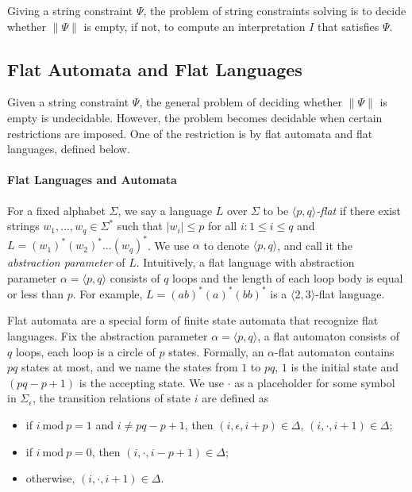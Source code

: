 \documentclass[runningheads]{llncs}
\begin{document}
Giving a string constraint $\Psi$,
the problem of string constraints solving is to decide 
whether $\lVert \Psi \rVert$ is empty,
if not, to compute an interpretation $I$ that satisfies $\Psi$.


\subsection{Flat Automata and Flat Languages}

Given a string constraint $\Psi$,
the general problem of deciding whether $\lVert \Psi \rVert$ is empty is undecidable.
However, 
the problem becomes decidable when certain restrictions are imposed.
One of the restriction is by flat automata and flat languages, 
defined below. 

\paragraph{Flat Languages and Automata}
For a fixed alphabet $\Sigma$,
we say a language $L$ over $\Sigma$ to be \emph{$\langle p,q \rangle$-flat} if 
there exist strings $w_1,...,w_q \in \Sigma^*$ such that
$|w_i|\le p$ for all $i:1\le i \le q$ 
and $L = (w_1)^*(w_2)^*...(w_q)^*$. 
We use $\alpha$ to denote $\langle p,q \rangle$, 
and call it the \emph{abstraction parameter} of $L$.
Intuitively,
a flat language with abstraction parameter $\alpha = \langle p,q \rangle$
consists of $q$ loops and the length of each loop body is equal or less than $p$.
For example,
$L = (ab)^*(a)^*(bb)^*$ is a $\langle 2,3 \rangle$-flat language.

Flat automata are a special form of finite state automata that 
recognize flat languages.
Fix the abstraction parameter $\alpha=\langle p,q\rangle$,
a flat automaton consists of $q$ loops,
each loop is a circle of $p$ states.
Formally, 
an $\alpha$-flat automaton contains $p q$ states at most,
and we name the states from $1$ to $p q$,
$1$ is the initial state and $(p q - p + 1)$ is the accepting state.
We use $\cdot$ as a placeholder for some symbol in $\Sigma_\epsilon$,
the transition relations of state $i$ are defined as 
\begin{itemize}
    \item if $i\  \text{mod}\  p = 1$ and $i \neq pq-p+1$, then 
    $(i,\epsilon,i+p)\in \Delta$,
    $(i, \cdot ,i+1) \in \Delta$;
    \item if $i\  \text{mod}\  p = 0$, then 
    $(i,\cdot , i-p+1) \in \Delta$;
    \item otherwise, $(i,\cdot, i+1) \in \Delta$.
\end{itemize}
\end{document}
